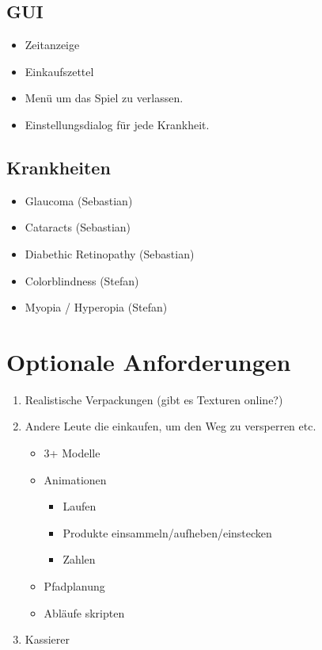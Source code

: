 ﻿\documentclass[a4paper, 11pt]{scrartcl}
\newcommand{\entwickler}[1]{\textcolor{BurntOrange}{(#1)}}
\newcommand{\Stefan}{\entwickler{Stefan}}
\newcommand{\Sebastian}{\entwickler{Sebastian}}
\begin{document}
\subsection{GUI}
\begin{itemize}
    \item Zeitanzeige
    \item Einkaufszettel
    \item Menü um das Spiel zu verlassen.
    \item Einstellungsdialog für jede Krankheit.
\end{itemize}


\subsection{Krankheiten}
\begin{itemize}
    \item Glaucoma \Sebastian
    \item Cataracts \Sebastian
    \item Diabethic Retinopathy \Sebastian
    \item Colorblindness \Stefan
    \item Myopia / Hyperopia \Stefan
\end{itemize}



\section{Optionale Anforderungen}
\begin{enumerate}
    \item Realistische Verpackungen (gibt es Texturen online?)
    \item Andere Leute die einkaufen, um den Weg zu versperren etc.
    \begin{itemize}
        \item 3+ Modelle
        \item Animationen
        \begin{itemize}
            \item Laufen
            \item Produkte einsammeln/aufheben/einstecken
            \item Zahlen
        \end{itemize}
        \item Pfadplanung
        \item Abläufe skripten
    \end{itemize}
    \item Kassierer
\end{enumerate}
\end{document}
